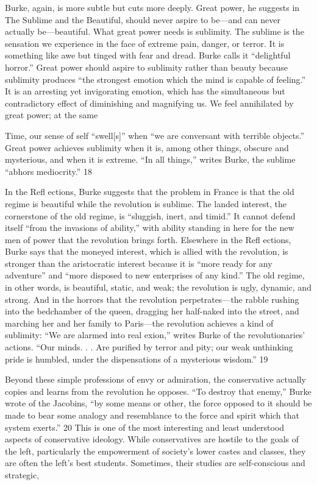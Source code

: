  \par 
Burke, again, is more subtle but cuts more deeply. Great power, he suggests in The Sublime and the Beautiful, should never aspire to be—and can never actually be—beautiful. What great power needs is sublimity. The sublime is the sensation we experience in the face of extreme pain, danger, or terror. It is something like awe but tinged with fear and dread. Burke calls it “delightful horror.” Great power should aspire to sublimity rather than beauty because sublimity produces “the strongest emotion which the mind is capable of feeling.” It is an arresting yet invigorating emotion, which has the simultaneous but contradictory effect of diminishing and magnifying us. We feel annihilated by great power; at the same
 \par 
Time, our sense of self “swell[s]” when “we are conversant with terrible objects.” Great power achieves sublimity when it is, among other things, obscure and mysterious, and when it is extreme. “In all things,” writes Burke, the sublime “abhors mediocrity.” 18
 \par 
In the Refl ections, Burke suggests that the problem in France is that the old regime is beautiful while the revolution is sublime. The landed interest, the cornerstone of the old regime, is “sluggish, inert, and timid.” It cannot defend itself “from the invasions of ability,” with ability standing in here for the new men of power that the revolution brings forth. Elsewhere in the Refl ections, Burke says that the moneyed interest, which is allied with the revolution, is stronger than the aristocratic interest because it is “more ready for any adventure” and “more disposed to new enterprises of any kind.” The old regime, in other words, is beautiful, static, and weak; the revolution is ugly, dynamic, and strong. And in the horrors that the revolution perpetrates—the rabble rushing into the bedchamber of the queen, dragging her half-naked into the street, and marching her and her family to Paris—the revolution achieves a kind of sublimity: “We are alarmed into real exion,” writes Burke of the revolutionaries’ actions. “Our minds. . . Are purified by terror and pity; our weak unthinking pride is humbled, under the dispensations of a mysterious wisdom.” 19
 \par 
Beyond these simple professions of envy or admiration, the conservative actually copies and learns from the revolution he opposes. “To destroy that enemy,” Burke wrote of the Jacobins, “by some means or other, the force opposed to it should be made to bear some analogy and resemblance to the force and spirit which that system exerts.” 20 This is one of the most interesting and least understood aspects of conservative ideology. While conservatives are hostile to the goals of the left, particularly the empowerment of society’s lower castes and classes, they are often the left’s best students. Sometimes, their studies are self-conscious and strategic,
